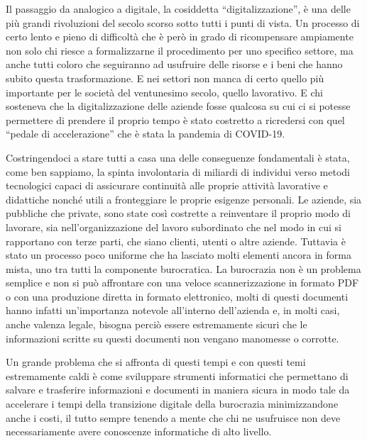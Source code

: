 Il passaggio da analogico a digitale, la cosiddetta “digitalizzazione”, è una delle più grandi
rivoluzioni del secolo scorso sotto tutti i punti di vista. Un processo di certo lento e pieno
di difficoltà che è però in grado di ricompensare ampiamente non solo chi riesce a
formalizzarne il procedimento per uno specifico settore, ma anche tutti coloro che
seguiranno ad usufruire delle risorse e i beni che hanno subito questa trasformazione.
E nei settori non manca di certo quello più importante per le società del ventunesimo secolo,
quello lavorativo. E chi sosteneva che la digitalizzazione delle aziende fosse qualcosa su cui
ci si potesse permettere di prendere il proprio tempo è stato costretto a ricredersi con quel
“pedale di accelerazione” che è stata la pandemia di COVID-19.

Costringendoci a stare tutti a casa una delle conseguenze fondamentali è stata,
come ben sappiamo, la spinta involontaria
di miliardi di individui verso metodi tecnologici capaci di assicurare continuità alle proprie
attività lavorative e didattiche nonché utili a fronteggiare le proprie esigenze personali.
Le aziende, sia pubbliche che private, sono state così costrette a reinventare il proprio modo
di lavorare, sia nell’organizzazione del lavoro subordinato che nel modo in cui si rapportano
con terze parti, che siano clienti, utenti o altre aziende. Tuttavia è stato un processo poco
uniforme che ha lasciato molti elementi ancora in forma mista,
uno tra tutti la componente burocratica. 
La burocrazia non è un problema semplice e non si può affrontare con una veloce
scannerizzazione in formato PDF o con una produzione diretta
in formato elettronico, molti di questi documenti hanno infatti un’importanza notevole
all’interno dell’azienda e, in molti casi, anche valenza legale, bisogna perciò essere
estremamente sicuri che le informazioni scritte su questi documenti
non vengano manomesse o corrotte.

Un grande problema che si affronta di questi tempi e con questi temi estremamente
caldi è come sviluppare strumenti informatici che permettano di salvare e trasferire
informazioni e documenti in maniera sicura in modo tale da accelerare i tempi della
transizione digitale della burocrazia minimizzandone anche i costi, il tutto sempre
tenendo a mente che chi ne usufruisce non deve necessariamente avere conoscenze informatiche
di alto livello.

